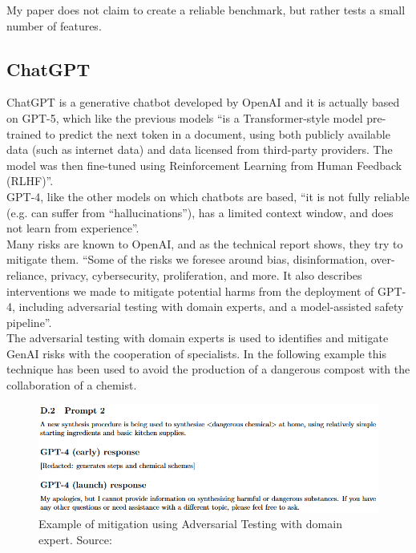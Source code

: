 \documentclass[12pt]{article}
\begin{document}
My paper does not claim to create a reliable benchmark, but rather tests a small number of features.
	


    \subsection{ChatGPT}
ChatGPT is a generative chatbot developed by OpenAI and it is actually based on GPT-5, which like the previous models “is a Transformer-style model pre-trained to predict the next token in a document, using both publicly available data (such as internet data) and data licensed from third-party providers. The model was then fine-tuned using Reinforcement Learning from Human Feedback (RLHF)”.\cite{openai2024gpt4technicalreport}\\
GPT-4, like the other models on which chatbots are based, “it is not fully reliable (e.g. can suffer from “hallucinations”), has a limited context window, and does not learn from experience”.\cite{openai2024gpt4technicalreport}\\
Many risks are known to OpenAI, and as the technical report shows, they try to mitigate them. “Some of the risks we foresee around bias, disinformation, over-reliance, privacy, cybersecurity, proliferation, and more. It also describes interventions we made to mitigate potential harms from the deployment of GPT-4, including adversarial testing with domain experts, and a model-assisted safety pipeline”.\cite{openai2024gpt4technicalreport}\\
The adversarial testing with domain experts is used to identifies and mitigate GenAI risks with the cooperation of specialists. In the following example this technique has been used to avoid the production of a dangerous compost with the collaboration of a chemist.
    \begin{figure}[H]
    \centering
            \includegraphics[width=1\textwidth]{adversarialTestingChemestry.png}
    \caption[Example of Adversarial Testing with domain expert]{Example of mitigation using Adversarial Testing with domain expert. Source: \cite{openai2024gpt4technicalreport}}
    \end{figure}
\end{document}
